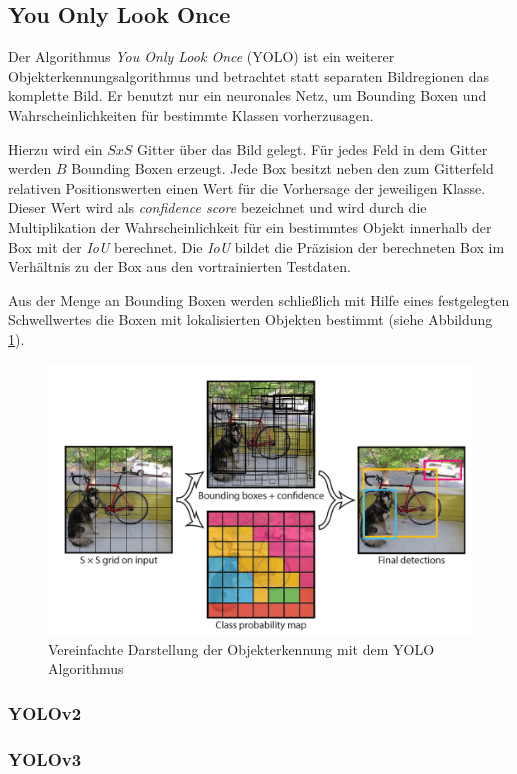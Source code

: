 \subsection{You Only Look Once}

Der Algorithmus \textit{You Only Look Once} (YOLO) ist ein weiterer Objekterkennungsalgorithmus und betrachtet statt separaten Bildregionen das komplette Bild. Er benutzt nur ein neuronales Netz, um Bounding Boxen und Wahrscheinlichkeiten für bestimmte Klassen vorherzusagen.

Hierzu wird ein $S x S$ Gitter über das Bild gelegt. Für jedes Feld in dem Gitter werden $B$ Bounding Boxen erzeugt. Jede Box besitzt neben den zum Gitterfeld relativen Positionswerten einen Wert für die Vorhersage der jeweiligen Klasse. Dieser Wert wird als \textit{confidence score} bezeichnet und wird durch die Multiplikation der Wahrscheinlichkeit für ein bestimmtes Objekt innerhalb der Box mit der \textit{IoU} berechnet. Die \textit{IoU} bildet die Präzision der berechneten Box im Verhältnis zu der Box aus den vortrainierten Testdaten. \cite{JosephRedmon.2016} 

Aus der Menge an Bounding Boxen werden schließlich mit Hilfe eines festgelegten Schwellwertes die Boxen mit lokalisierten Objekten bestimmt (siehe Abbildung \ref{yolo_model}).

\begin{figure}[ht]
	\begin{center}
		\includegraphics[width=15cm]{Bilder/yolo_model.png} 
		\caption[Vereinfachte Darstellung der Objekterkennung mit dem YOLO Algorithmus]{Vereinfachte Darstellung der Objekterkennung mit dem YOLO Algorithmus \cite{JosephRedmon.2016}}
		\label{yolo_model}
	\end{center}
\end{figure}

\subsubsection{YOLOv2}

\subsubsection{YOLOv3}




